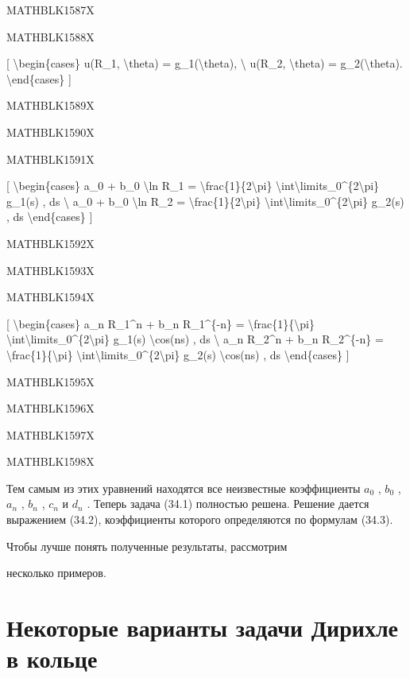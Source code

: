 \documentclass[
]{article}
\begin{document}
MATHBLK1587X

MATHBLK1588X

{[} \textbackslash begin\{cases\} u(R\_1, \textbackslash theta) =
g\_1(\textbackslash theta), \textbackslash{} u(R\_2,
\textbackslash theta) = g\_2(\textbackslash theta).
\textbackslash end\{cases\} {]}

MATHBLK1589X

MATHBLK1590X

MATHBLK1591X

{[} \textbackslash begin\{cases\} a\_0 + b\_0 \textbackslash ln R\_1 =
\textbackslash frac\{1\}\{2\textbackslash pi\}
\textbackslash int\textbackslash limits\_0\^{}\{2\textbackslash pi\}
g\_1(s) , ds \textbackslash{} a\_0 + b\_0 \textbackslash ln R\_2 =
\textbackslash frac\{1\}\{2\textbackslash pi\}
\textbackslash int\textbackslash limits\_0\^{}\{2\textbackslash pi\}
g\_2(s) , ds \textbackslash end\{cases\} {]}

MATHBLK1592X

MATHBLK1593X

MATHBLK1594X

{[} \textbackslash begin\{cases\} a\_n R\_1\^{}n + b\_n R\_1\^{}\{-n\} =
\textbackslash frac\{1\}\{\textbackslash pi\}
\textbackslash int\textbackslash limits\_0\^{}\{2\textbackslash pi\}
g\_1(s) \textbackslash cos(ns) , ds \textbackslash{} a\_n R\_2\^{}n +
b\_n R\_2\^{}\{-n\} = \textbackslash frac\{1\}\{\textbackslash pi\}
\textbackslash int\textbackslash limits\_0\^{}\{2\textbackslash pi\}
g\_2(s) \textbackslash cos(ns) , ds \textbackslash end\{cases\} {]}

MATHBLK1595X

MATHBLK1596X

MATHBLK1597X

MATHBLK1598X

Тем самым из этих уравнений находятся все неизвестные коэффициенты
\(a_0\) , \(b_0\) , \(a_n\) , \(b_n\) , \(c_n\) и \(d_n\) . Теперь
задача (34.1) полностью решена. Решение дается выражением (34.2),
коэффициенты которого определяются по формулам (34.3).

Чтобы лучше понять полученные результаты, рассмотрим

несколько примеров.

\section{Некоторые варианты задачи Дирихле в
кольце}\label{ux43dux435ux43aux43eux442ux43eux440ux44bux435-ux432ux430ux440ux438ux430ux43dux442ux44b-ux437ux430ux434ux430ux447ux438-ux434ux438ux440ux438ux445ux43bux435-ux432-ux43aux43eux43bux44cux446ux435}
\end{document}
